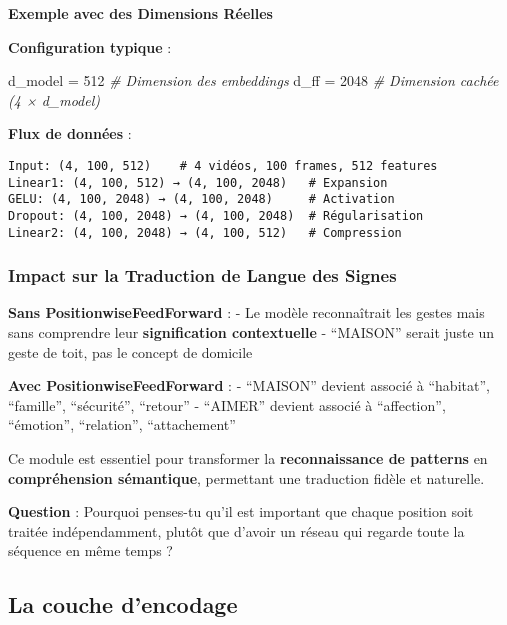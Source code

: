 \documentclass[12pt]{article}
\newenvironment{Shaded}{}{}
\newcommand{\DecValTok}[1]{\textcolor[rgb]{0.25,0.63,0.44}{{#1}}}
\newcommand{\CommentTok}[1]{\textcolor[rgb]{0.38,0.63,0.69}{\textit{{#1}}}}
\newcommand{\NormalTok}[1]{{#1}}
\newcommand{\OperatorTok}[1]{\textcolor[rgb]{0.40,0.40,0.40}{{#1}}}
\begin{document}
\textbf{Exemple avec des Dimensions Réelles}

\textbf{Configuration typique} :

\begin{Shaded}
\begin{Highlighting}[]
\NormalTok{d\_model }\OperatorTok{=} \DecValTok{512}    \CommentTok{\# Dimension des embeddings}
\NormalTok{d\_ff }\OperatorTok{=} \DecValTok{2048}      \CommentTok{\# Dimension cachée (4 × d\_model)}
\end{Highlighting}
\end{Shaded}

\textbf{Flux de données} :

\begin{verbatim}
Input: (4, 100, 512)    # 4 vidéos, 100 frames, 512 features
Linear1: (4, 100, 512) → (4, 100, 2048)   # Expansion
GELU: (4, 100, 2048) → (4, 100, 2048)     # Activation
Dropout: (4, 100, 2048) → (4, 100, 2048)  # Régularisation  
Linear2: (4, 100, 2048) → (4, 100, 512)   # Compression
\end{verbatim}

\subsubsection{Impact sur la Traduction de Langue des
Signes}\label{impact-sur-la-traduction-de-langue-des-signes}

\textbf{Sans PositionwiseFeedForward} : - Le modèle reconnaîtrait les
gestes mais sans comprendre leur \textbf{signification contextuelle} -
``MAISON'' serait juste un geste de toit, pas le concept de domicile

\textbf{Avec PositionwiseFeedForward} : - ``MAISON'' devient associé à
``habitat'', ``famille'', ``sécurité'', ``retour'' - ``AIMER'' devient
associé à ``affection'', ``émotion'', ``relation'', ``attachement''

Ce module est essentiel pour transformer la \textbf{reconnaissance de
patterns} en \textbf{compréhension sémantique}, permettant une
traduction fidèle et naturelle.

\textbf{Question} : Pourquoi penses-tu qu'il est important que chaque
position soit traitée indépendamment, plutôt que d'avoir un réseau qui
regarde toute la séquence en même temps ?

    \subsection{La couche d'encodage}\label{la-couche-dencodage}
\end{document}
